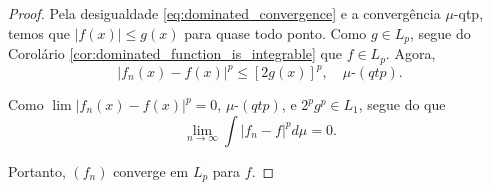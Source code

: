 \begin{proof}
    Pela desigualdade \eqref{eq:dominated_convergence} e a convergência $\mu$-qtp, temos que $|f(x)| \leq g(x)$ para quase todo ponto. Como $g \in L_p$, segue do Corolário \ref{cor:dominated_function_is_integrable} que $f \in L_p$. Agora,
    \begin{equation*}
        |f_n(x) - f(x)|^p \leq [2 g(x)]^p, \quad \mu\text{-}(qtp).
    \end{equation*}
    
    Como $\lim |f_n(x) - f(x)|^p = 0$, \(\mu\text{-}(qtp)\), e $2^p g^p \in L_1$, segue do  que
    \begin{equation*}
        \lim_{n\rightarrow \infty} \int|f_n - f|^p d\mu = 0.
    \end{equation*}

    Portanto, $(f_n)$ converge em $L_p$ para $f$.
\end{proof}
